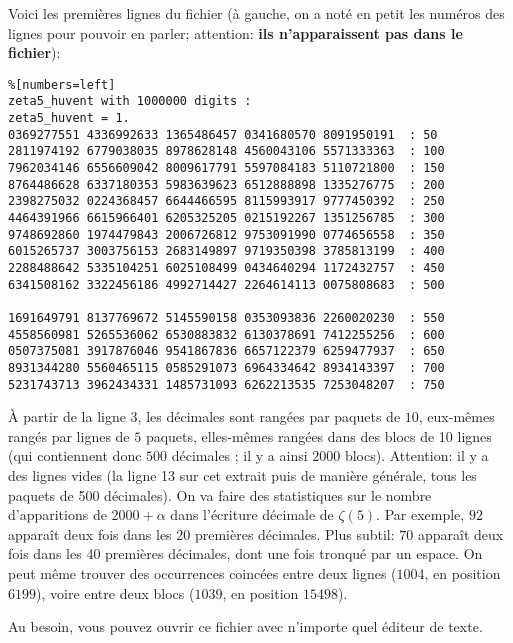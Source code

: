 Voici les premières lignes du fichier (à gauche, on a noté en petit
les numéros des lignes pour pouvoir en parler; attention: \textbf{ils n'apparaissent pas
dans le fichier}):
\begin{lstlisting}%[numbers=left]
zeta5_huvent with 1000000 digits : 
zeta5_huvent = 1.
0369277551 4336992633 1365486457 0341680570 8091950191  : 50
2811974192 6779038035 8978628148 4560043106 5571333363  : 100
7962034146 6556609042 8009617791 5597084183 5110721800  : 150
8764486628 6337180353 5983639623 6512888898 1335276775  : 200
2398275032 0224368457 6644466595 8115993917 9777450392  : 250
4464391966 6615966401 6205325205 0215192267 1351256785  : 300
9748692860 1974479843 2006726812 9753091990 0774656558  : 350
6015265737 3003756153 2683149897 9719350398 3785813199  : 400
2288488642 5335104251 6025108499 0434640294 1172432757  : 450
6341508162 3322456186 4992714427 2264614113 0075808683  : 500

1691649791 8137769672 5145590158 0353093836 2260020230  : 550
4558560981 5265536062 6530883832 6130378691 7412255256  : 600
0507375081 3917876046 9541867836 6657122379 6259477937  : 650
8931344280 5560465115 0585291073 6964334642 8934143397  : 700
5231743713 3962434331 1485731093 6262213535 7253048207  : 750
\end{lstlisting}

À partir  de la  ligne 3,  les décimales sont  rangées par  paquets de
$10$, eux-mêmes rangés par lignes  de $5$ paquets, elles-mêmes rangées
dans des blocs de 10 lignes (qui contiennent donc $500$ décimales ; il
y a ainsi $2000$ blocs).  Attention: il y a des lignes vides (la ligne
13 sur cet  extrait puis de manière générale, tous  les paquets de 500
décimales). On va faire des statistiques sur le nombre d'apparitions de
$2000 + \alpha$ dans l'écriture  décimale de $\zeta(5)$.  Par exemple,
$92$ apparaît deux fois dans les $20$ premières décimales. Plus subtil:
$70$ apparaît  deux fois dans  les $40$ premières décimales,  dont une
fois  tronqué par  un  espace.  On peut  même  trouver des  occurrences
coincées entre deux lignes ($1004$,  en position $6199$), voire entre
deux blocs ($1039$, en position $15498$).

Au besoin, vous pouvez ouvrir ce fichier avec n'importe quel éditeur
de texte.




